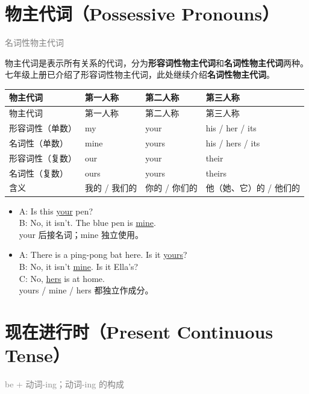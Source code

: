 \documentclass[11pt,a4paper]{ctexart}
\begin{document}
\section{物主代词（Possessive Pronouns）}
\noindent\textcolor{gray}{名词性物主代词}\par\smallskip
物主代词是表示所有关系的代词，分为\textbf{形容词性物主代词}和\textbf{名词性物主代词}两种。七年级上册已介绍了形容词性物主代词，此处继续介绍\textbf{名词性物主代词}。

{\footnotesize
\begin{longtable}{p{3.35cm}p{3.35cm}p{3.35cm}p{3.35cm}}
\hline
物主代词 & 第一人称 & 第二人称 & 第三人称 \\
\hline
\endfirsthead
\hline
物主代词 & 第一人称 & 第二人称 & 第三人称 \\
\hline
\endhead
\hline
\endfoot
形容词性（单数） & my & your & his / her / its \\
名词性（单数） & mine & yours & his / hers / its \\
形容词性（复数） & our & your & their \\
名词性（复数） & ours & yours & theirs \\
含义 & 我的 / 我们的 & 你的 / 你们的 & 他（她、它）的 / 他们的 \\
\end{longtable}
}

\begin{center}\end{center}

\begin{itemize}[leftmargin=1.4em]
\item A: Is this \underline{your} pen?\\ B: No, it isn’t. The blue pen is \underline{mine}.\\ your 后接名词；mine 独立使用。
\item A: There is a ping-pong bat here. Is it \underline{yours}?\\ B: No, it isn’t \underline{mine}. Is it Ella’s?\\ C: No, \underline{hers} is at home.\\ yours / mine / hers 都独立作成分。
\end{itemize}

\section{现在进行时（Present Continuous Tense）}
\noindent\textcolor{gray}{be + 动词-ing；动词-ing 的构成}\par\smallskip
\end{document}
